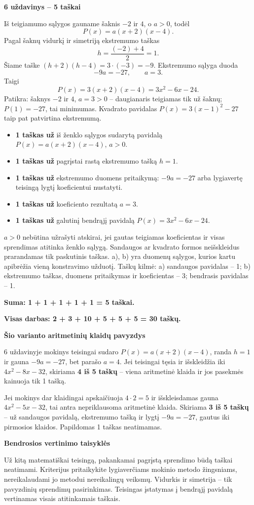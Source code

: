\documentclass[11pt]{article}
\newcommand{\sk}[1]{\par\medskip\textbf{#1}\par}
\begin{document}
\sk{6 uždavinys -- 5 taškai}
Iš teigiamumo sąlygos gauname šaknis $-2$ ir $4$, o $a>0$, todėl
\[P(x)=a(x+2)(x-4).\]
Pagal šaknų vidurkį ir simetriją ekstremumo taškas
\[h=\frac{(-2)+4}2=1.\]
Šiame taške $(h+2)(h-4)=3\cdot(-3)=-9$. Ekstremumo sąlyga duoda
\[-9a=-27,\qquad a=3.\]
Taigi
\[\boxed{P(x)=3(x+2)(x-4)=3 x^{2} - 6 x - 24}.\]
Patikra: šaknys $-2$ ir $4$, $a=3>0$ -- daugianaris teigiamas tik už šaknų; $P(1)=-27$, tai minimumas. Kvadrato pavidalas $P(x)=3(x-1)^2-27$ taip pat patvirtina ekstremumą.
\begin{itemize}
\item \textbf{1 taškas už} iš ženklo sąlygos sudarytą pavidalą $P(x)=a(x+2)(x-4)$, $a>0$.
\item \textbf{1 taškas už} pagrįstai rastą ekstremumo tašką $h=1$.
\item \textbf{1 taškas už} ekstremumo duomens pritaikymą: $-9a=-27$ arba lygiavertę teisingą lygtį koeficientui nustatyti.
\item \textbf{1 taškas už} koeficiento rezultatą $a=3$.
\item \textbf{1 taškas už} galutinį bendrąjį pavidalą $P(x)=3 x^{2} - 6 x - 24$.
\end{itemize}
$a>0$ nebūtina užrašyti atskirai, jei gautas teigiamas koeficientas ir visas sprendimas atitinka ženklo sąlygą. Sandaugos ar kvadrato formos neišskleidus prarandamas tik paskutinis taškas. a), b) yra duomenų sąlygos, kurios kartu apibrėžia vieną konstravimo užduotį. Taškų kilmė: a) sandaugos pavidalas -- 1; b) ekstremumo taškas, duomens pritaikymas ir koeficientas -- 3; bendrasis pavidalas -- 1.\par\textbf{Suma: 1 + 1 + 1 + 1 + 1 = 5 taškai.}\par\textbf{Visas darbas: 2 + 3 + 10 + 5 + 5 + 5 = 30 taškų.}

\sk{Šio varianto aritmetinių klaidų pavyzdys}
6 uždavinyje mokinys teisingai sudaro $P(x)=a(x+2)(x-4)$, randa $h=1$ ir gauna $-9a=-27$, bet parašo $a=4$. Jei teisingai tęsia ir išskleidžia iki $4 x^{2} - 8 x - 32$, skiriama \textbf{4 iš 5 taškų} -- viena aritmetinė klaida ir jos pasekmės kainuoja tik 1 tašką.

Jei mokinys dar klaidingai apskaičiuoja $4\cdot2=5$ ir išskleisdamas gauna $4 x^{2} - 5 x - 32$, tai antra nepriklausoma aritmetinė klaida. Skiriama \textbf{3 iš 5 taškų} -- už sandaugos pavidalą, ekstremumo tašką ir lygtį $-9a=-27$, gautus iki pirmosios klaidos. Papildomas 1 taškas neatimamas.
\newpage
\sk{Bendrosios vertinimo taisyklės}
Už kitą matematiškai teisingą, pakankamai pagrįstą sprendimo būdą taškai neatimami. Kriterijus pritaikykite lygiaverčiams mokinio metodo žingsniams, nereikalaudami jo metodui nereikalingų veiksmų. Vidurkis ir simetrija -- tik pavyzdinių sprendimų pasirinkimas. Teisingas įstatymas į bendrąjį pavidalą vertinamas visais atitinkamais taškais.
\end{document}
